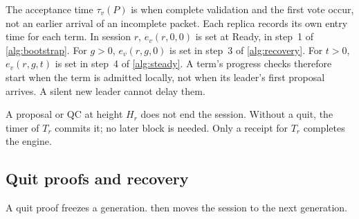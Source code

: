 \documentclass[11pt,a4paper]{article}
\newif\ifrevmarks
\newcommand{\Rv}[1]{\ifrevmarks\leavevmode{\color{rvBlue}#1}\else#1\fi}
\newcommand{\Cid}[1]{\ifrevmarks\textsuperscript{\hyperlink{chg:#1}{\color{rvBlue}\sffamily\scriptsize#1}}\fi}
\begin{document}
The acceptance time $\tau_v(P)$ is when complete validation and the first
vote occur, not an earlier arrival of an incomplete packet. Each replica
records its own entry time for each term. In session $r$, $e_v(r,0,0)$ is
set at Ready, in step~\Rv{1\Cid{C12}} of \cref{alg:bootstrap}. For $g>0$, $e_v(r,g,0)$ is
set in step~3 of \cref{alg:recovery}. For $t>0$, $e_v(r,g,t)$ is set in
step~4 of \cref{alg:steady}. A term's progress checks therefore start
when the term is admitted locally, not when its leader's first proposal
arrives. A silent new leader cannot delay them.

A proposal or QC at height $H_r$ does not end the session. Without a
quit, the timer of $T_r$ commits it; no later block is needed. Only a
receipt for $T_r$ completes the engine.

\subsection{Quit proofs and recovery}
\label{sec:quit}
A quit proof freezes a generation.  then moves the
session to the next generation.
\end{document}
